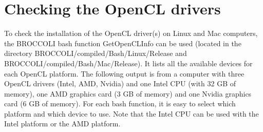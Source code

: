 \section{Checking the OpenCL drivers}

To check the installation of the OpenCL driver(s) on Linux and Mac computers, the BROCCOLI bash function GetOpenCLInfo can be used (located in the directory BROCCOLI/compiled/Bash/Linux/Release and BROCCOLI/compiled/Bash/Mac/Release). It lists all the available devices for each OpenCL platform. The following output is from a computer with three OpenCL drivers (Intel, AMD, Nvidia) and one Intel CPU (with 32 GB of memory), one AMD graphics card (3 GB of memory) and one Nvidia graphics card (6 GB of memory). For each bash function, it is easy to select which platform and which device to use. Note that the Intel CPU can be used with the Intel platform or the AMD platform. 

